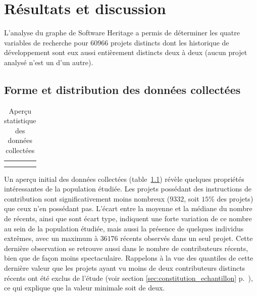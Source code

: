 \chapter{Résultats et discussion}

\captionsetup[figure]{format=plain,singlelinecheck=true,justification=centering}
\captionsetup[subfigure]{format=plain,singlelinecheck=true,justification=centering}
\captionsetup[table]{format=plain,singlelinecheck=true,justification=centering}

L'analyse du graphe de Software Heritage a permis de déterminer les quatre variables de recherche pour
$60 966$ projets distincts dont les historique de développement sont eux aussi entièrement distincts deux à
deux (aucun projet analysé n'est un  d'un autre).

\section{Forme et distribution des données collectées}

\begin{table}[ht]
    \centering
    \begin{tabular}{cc}
         &
        
        \\
         &
        
    \end{tabular}
    \caption{Aperçu statistique des données collectées}
    \label{tab:data_description}
\end{table}

Un aperçu initial des données collectées (table~\ref{tab:data_description}) révèle quelques propriétés
intéressantes de la population étudiée. Les projets possédant des instructions de contribution sont
significativement moins nombreux ($9 332$, soit $15\%$ des projets) que ceux n'en possédant pas. L'écart entre
la moyenne et la médiane du nombre de  récents, ainsi que sont écart type, indiquent une forte
variation de ce nombre au sein de la population étudiée, mais aussi la présence de quelques individus
extrêmes, avec un maximum à $36 176$  récents observés dans un seul projet. Cette dernière
observation se retrouve aussi dans le nombre de contributeurs récents, bien que de façon moins spectaculaire.
Rappelons à la vue des quantiles de cette dernière valeur que les projets ayant vu moins de deux contributeurs
distincts récents ont été exclus de l'étude (voir section \ref{sec:constitution_echantillon}
p.~\pageref{sec:constitution_echantillon}), ce qui explique que la valeur minimale soit de deux.

